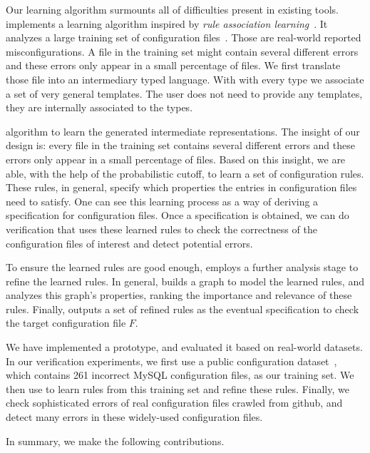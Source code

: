 Our learning algorithm surmounts all of difficulties present in 
existing tools.  \app implements a learning
algorithm inspired by {\em rule association
learning}~\cite{agrawal1993mining}. It analyzes a large training set of configuration  files~\cite{configdataset}. Those are real-world reported misconfigurations. A file in the training set might 
contain several different errors and these errors only appear 
in a small percentage of files. We first translate those file into an 
intermediary typed language. With with every type we associate 
a set of very general templates. The user does not
need to provide any templates, they are internally associated to the types. 


 algorithm to learn the generated intermediate representations.
The insight of our design is: every file in the training set
contains several different errors and these errors only appear 
in a small percentage of files. Based on this insight,
we are able, with the help of the probabilistic cutoff, to learn a
set of configuration rules. These rules, in general, specify 
which properties the entries in configuration files need to satisfy. 
One can see this learning process as a way of deriving  
a specification for configuration files.  
Once a specification is obtained, we can do verification that 
uses these learned rules to check the correctness of 
the configuration files
of interest and detect potential errors.





To ensure the learned rules are good enough,
\app employs a further analysis stage to refine the learned rules.
In general, \app builds a graph to model the learned rules,
and analyzes this graph's properties, ranking the importance
and relevance of these rules. Finally, \app outputs
a set of refined rules as the eventual specification
to check the target configuration file $F$.

We have implemented a \app prototype, and evaluated it based on
real-world datasets. In our verification experiments, 
we first use a public configuration dataset~\cite{configdataset}, which
contains 261 incorrect MySQL configuration files, as our
training set. We then use \app to learn rules from this training set
and refine these rules. Finally, we check sophisticated 
errors of real configuration files crawled from github,
and detect many errors in these widely-used configuration files.

In summary, we make the following contributions.


